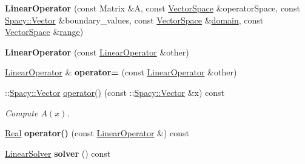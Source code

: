 \begin{DoxyCompactItemize}
\item 
\hypertarget{classSpacy_1_1dealII_1_1LinearOperator_ab12fd45590e82cfaa4bfc73efda4ee4c}{{\bfseries Linear\-Operator} (const Matrix \&A, const \hyperlink{classSpacy_1_1VectorSpace}{Vector\-Space} \&operator\-Space, const \hyperlink{classSpacy_1_1Vector}{Spacy\-::\-Vector} \&boundary\-\_\-values, const \hyperlink{classSpacy_1_1VectorSpace}{Vector\-Space} \&\hyperlink{classSpacy_1_1OperatorBase_a2588f9b3e0188820c4c494e63293dc6f}{domain}, const \hyperlink{classSpacy_1_1VectorSpace}{Vector\-Space} \&\hyperlink{classSpacy_1_1OperatorBase_ab19d3b7a6f290b1079248f1e567e53d6}{range})}\label{classSpacy_1_1dealII_1_1LinearOperator_ab12fd45590e82cfaa4bfc73efda4ee4c}

\item 
\hypertarget{classSpacy_1_1dealII_1_1LinearOperator_a9eea3a814274ab47d7b6127135cb2c7c}{{\bfseries Linear\-Operator} (const \hyperlink{classSpacy_1_1dealII_1_1LinearOperator}{Linear\-Operator} \&other)}\label{classSpacy_1_1dealII_1_1LinearOperator_a9eea3a814274ab47d7b6127135cb2c7c}

\item 
\hypertarget{classSpacy_1_1dealII_1_1LinearOperator_a131d68e2e6d1b19616842fb2485bb7bc}{\hyperlink{classSpacy_1_1dealII_1_1LinearOperator}{Linear\-Operator} \& {\bfseries operator=} (const \hyperlink{classSpacy_1_1dealII_1_1LinearOperator}{Linear\-Operator} \&other)}\label{classSpacy_1_1dealII_1_1LinearOperator_a131d68e2e6d1b19616842fb2485bb7bc}

\item 
\-::\hyperlink{classSpacy_1_1Vector}{Spacy\-::\-Vector} \hyperlink{classSpacy_1_1dealII_1_1LinearOperator_a619887409321d9effeec2ce049a0d6d0}{operator()} (const \-::\hyperlink{classSpacy_1_1Vector}{Spacy\-::\-Vector} \&x) const 
\begin{DoxyCompactList}\small\item\em Compute $A(x)$. \end{DoxyCompactList}\item 
\hypertarget{classSpacy_1_1dealII_1_1LinearOperator_a2cf1cb0ad567fe4c3f56c129c47fb7e3}{\hyperlink{classSpacy_1_1Real}{Real} {\bfseries operator()} (const \hyperlink{classSpacy_1_1dealII_1_1LinearOperator}{Linear\-Operator} \&) const }\label{classSpacy_1_1dealII_1_1LinearOperator_a2cf1cb0ad567fe4c3f56c129c47fb7e3}

\item 
\hypertarget{classSpacy_1_1dealII_1_1LinearOperator_a023d33af4a569bd87425b3110d2b4728}{\hyperlink{namespaceSpacy_adcd0d78166a9c972b8a2e5a689fc2d03}{Linear\-Solver} {\bfseries solver} () const }\label{classSpacy_1_1dealII_1_1LinearOperator_a023d33af4a569bd87425b3110d2b4728}


\end{DoxyCompactItemize}

